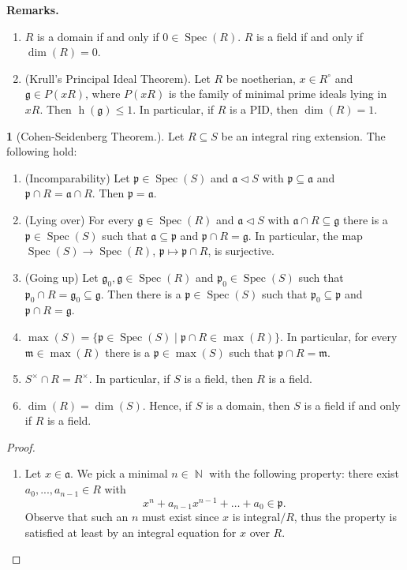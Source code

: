 \documentclass[12pt,a4paper]{report}
\theoremstyle{definition}
\theoremstyle{num.custom-title}
\newtheorem{teo_custom-title}[theorem]{} %
\DeclareMathOperator{\N}{\mathbb{N}}
\DeclareMathOperator{\sse}{\subseteq}
\DeclareMathOperator{\Spec}{Spec}
\DeclareMathOperator{\h}{h}
\newcommand{\g}{\mathfrak{g}}
\newcommand{\p}{\mathfrak{p}}
\newcommand{\m}{\mathfrak{m}}
\begin{document}
\noindent\textbf{Remarks.}
\begin{enumerate}
\item $R$ is a domain if and only if $0 \in \Spec(R)$. $R$ is a field if and only if $\dim(R)=0$.
\item (Krull's Principal Ideal Theorem). Let $R$ be noetherian, $x \in R^\circ$ and $\g \in P(xR)$, where $P(xR)$ is the family of minimal prime ideals lying in $xR$. Then $\h(\g) \leq 1$. In particular, if $R$ is a PID, then $\dim(R)=1$.
\end{enumerate}

\begin{teo_custom-title}[Cohen-Seidenberg Theorem.]\label{thm_cohen-seid}
Let $R \sse S$ be an integral ring extension. The following hold:
\begin{enumerate}
\item (Incomparability) Let $\p \in \Spec(S)$ and $\mathfrak{a} \lhd S$ with $\p \sse \mathfrak{a}$ and $\p \cap R = \mathfrak{a} \cap R$. Then $\p = \mathfrak{a}$.
\item (Lying over) For every $\g \in \Spec(R)$ and $\mathfrak{a} \lhd S$ with $\mathfrak{a} \cap R \sse \g$ there is a $\p \in \Spec(S)$ such that $\mathfrak{a} \sse \p$ and $\p \cap R = \g$. In particular, the map $\Spec(S) \to \Spec(R)$, $\p \mapsto \p \cap R$, is surjective.
\item (Going up) Let $\g_0, \g \in \Spec(R)$ and $\p_0 \in \Spec(S)$ such that $\p_0 \cap R = \g_0 \sse \g$. Then there is a $\p \in \Spec(S)$ such that $\p_0 \sse \p$ and $\p \cap R = \g$.
\item $\max(S) = \{ \p \in \Spec(S) \mid \p \cap R \in \max(R) \}$. In particular, for every $\m \in \max(R)$ there is a $\p \in \max(S)$ such that $\p \cap R = \m$.
\item $S^\times \cap R = R^\times$. In particular, if $S$ is a field, then $R$ is a field.
\item $\dim(R) = \dim(S)$. Hence, if $S$ is a domain, then $S$ is a field if and only if $R$ is a field.
\end{enumerate}
\begin{proof}\ 
\begin{enumerate}
\item Let $x \in \mathfrak{a}$. We pick a minimal $n \in \N$ with the following property: there exist $a_0,...,a_{n-1} \in R$ with
\[
x^n + a_{n-1}x^{n-1} + \ldots + a_0 \in \p.
\]
Observe that such an $n$ must exist since $x$ is integral$/R$, thus the property is satisfied at least by an integral equation for $x$ over $R$.\\

\end{enumerate}
\end{proof}
\end{teo_custom-title}
\end{document}
